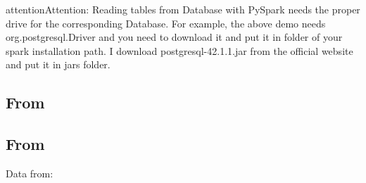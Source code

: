 \documentclass[letterpaper,12pt,english]{sphinxmanual}
\begin{document}
\begin{sphinxadmonition}{attention}{Attention:}
Reading tables from Database with PySpark needs the proper drive for the corresponding Database. For example, the above demo needs org.postgresql.Driver and you need to download it and put it in  folder of your spark installation path. I download postgresql-42.1.1.jar from the official website and put it in jars folder.
\end{sphinxadmonition}


\subsection{From }
\label{\detokenize{pdrdd:from-csv}}

%
\begin{sphinxVerbatim}[commandchars=\\\{\}]
  
  
\end{sphinxVerbatim}


\subsection{From }
\label{\detokenize{pdrdd:from-json}}
Data from: 

%
\begin{sphinxVerbatim}[commandchars=\\\{\}]
  
  
\end{sphinxVerbatim}
\end{document}

